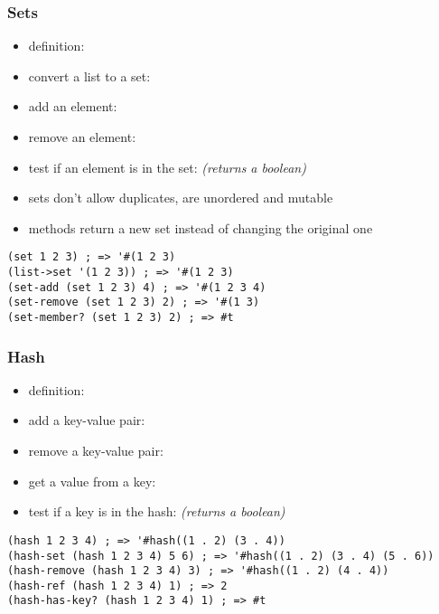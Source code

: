 \documentclass[a4paper,landscape,10pt]{article}
\begin{document}
\begin{multicols*}{2}
  \subsubsection{Sets}

  \begin{itemize}
    \item definition: 
    \item convert a list to a set: 
    \item add an element: 
    \item remove an element: 
    \item test if an element is in the set:  \textit{(returns a boolean)}
    \item sets don't allow duplicates, are unordered and mutable
    \item methods return a new set instead of changing the original one
  \end{itemize}

  \begin{lstlisting}[language=Racket]
(set 1 2 3) ; => '#(1 2 3)
(list->set '(1 2 3)) ; => '#(1 2 3)
(set-add (set 1 2 3) 4) ; => '#(1 2 3 4)
(set-remove (set 1 2 3) 2) ; => '#(1 3)
(set-member? (set 1 2 3) 2) ; => #t
  \end{lstlisting}

  \subsubsection{Hash}

  \begin{itemize}
    \item definition: 
    \item add a key-value pair: 
    \item remove a key-value pair: 
    \item get a value from a key: 
    \item test if a key is in the hash:  \textit{(returns a boolean)}
  \end{itemize}

  \begin{lstlisting}[language=Racket]
(hash 1 2 3 4) ; => '#hash((1 . 2) (3 . 4))
(hash-set (hash 1 2 3 4) 5 6) ; => '#hash((1 . 2) (3 . 4) (5 . 6))
(hash-remove (hash 1 2 3 4) 3) ; => '#hash((1 . 2) (4 . 4))
(hash-ref (hash 1 2 3 4) 1) ; => 2
(hash-has-key? (hash 1 2 3 4) 1) ; => #t
  \end{lstlisting}


\end{multicols*}
\end{document}
